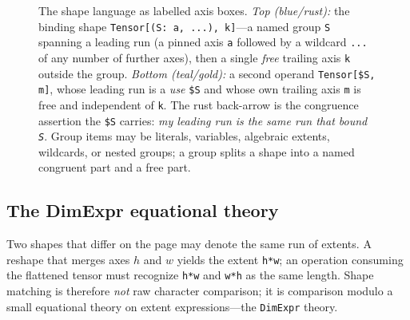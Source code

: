 \begin{figure}[t]
\caption[The shape algebra: items, groups, and the congruence back-arrow]{The
shape language as labelled axis boxes. \emph{Top (blue/rust):} the binding shape
\lstinline[style=l4style]|Tensor[(S: a, ...), k]|---a named group \texttt{S}
spanning a leading run (a pinned axis \texttt{a} followed by a wildcard
\texttt{...} of any number of further axes), then a single \emph{free} trailing
axis \texttt{k} outside the group. \emph{Bottom (teal/gold):} a second operand
\lstinline[style=l4style]|Tensor[$S, m]|, whose leading run is a \emph{use}
\lstinline[style=l4style]|$S| and whose own trailing axis \texttt{m} is free and
independent of \texttt{k}. The rust back-arrow is the congruence assertion the
\lstinline[style=l4style]|$S| carries: \emph{my leading run is the same run that
bound \texttt{S}}. Group items may be literals, variables, algebraic extents,
wildcards, or nested groups; a group splits a shape into a named congruent part
and a free part.}
\label{fig:b-shapealgebra}
\end{figure}

\subsection{The DimExpr equational theory}
\label{sec:b-dimexpr}

Two shapes that differ on the page may denote the same run of extents. A reshape
that merges axes $h$ and $w$ yields the extent \lstinline[style=l4style]|h*w|; an
operation consuming the flattened tensor must recognize
\lstinline[style=l4style]|h*w| and \lstinline[style=l4style]|w*h| as the same
length. Shape matching is therefore \emph{not} raw character comparison; it is
comparison modulo a small equational theory on extent expressions---the
\lstinline[style=l4style]|DimExpr| theory.

